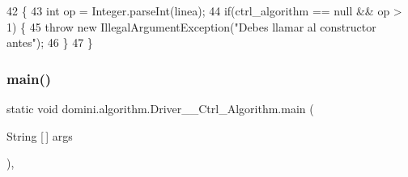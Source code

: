 \begin{DoxyCode}
42                                                                                         \{
43         \textcolor{keywordtype}{int} op = Integer.parseInt(linea);
44         \textcolor{keywordflow}{if}(ctrl\_algorithm == null && op > 1) \{
45             \textcolor{keywordflow}{throw} \textcolor{keyword}{new} IllegalArgumentException(\textcolor{stringliteral}{"Debes llamar al constructor antes"});
46         \}
47     \}
\end{DoxyCode}
\mbox{\label{classdomini_1_1algorithm_1_1Driver____Ctrl__Algorithm_a2aa6a8b8f8c0c991a11b30e2bd1f244e}} 
\subsubsection{\texorpdfstring{main()}{main()}}
{\footnotesize\ttfamily static void domini.\+algorithm.\+Driver\+\_\+\+\_\+\+Ctrl\+\_\+\+Algorithm.\+main (\begin{DoxyParamCaption}\item[{String \mbox{[}$\,$\mbox{]}}]{args }\end{DoxyParamCaption})\hspace{0.3cm}{\ttfamily [inline]}, {\ttfamily [static]}}


